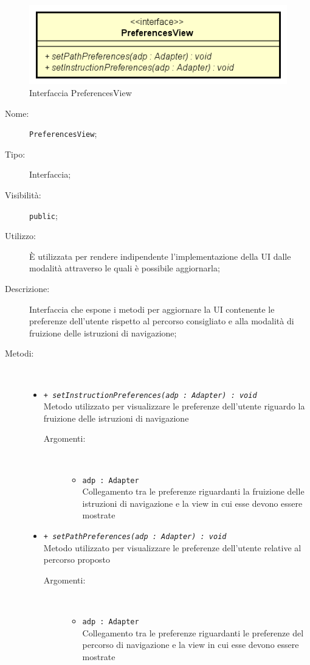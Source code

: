 \documentclass[../DefinizioneDiProdotto.tex]{subfiles}
\begin{document}
    \begin{figure}[H]
        \centering
        \includegraphics{img/PreferencesView.png}
        \caption{Interfaccia PreferencesView}\label{fig:view::PreferencesView} 
    \end{figure}
    \begin{description}
\item[Nome:] \texttt{PreferencesView};
\item[Tipo:] Interfaccia;
\item[Visibilità:] \texttt{public};
\item[Utilizzo:] È utilizzata per rendere indipendente l'implementazione della UI dalle modalità attraverso le quali è possibile aggiornarla;
\item[Descrizione:] Interfaccia che espone i metodi per aggiornare la UI contenente le preferenze dell'utente rispetto al percorso consigliato e alla modalità di fruizione delle istruzioni di navigazione;
\item[Metodi:] \
\begin{itemize}
\item \texttt{+ \textit{setInstructionPreferences(adp : Adapter) : void}}\\
Metodo utilizzato per visualizzare le preferenze dell'utente riguardo la fruizione delle istruzioni di navigazione
 \begin{description}
\item[Argomenti:] \
\begin{itemize}
\item \texttt{adp : Adapter}\\
Collegamento tra le preferenze riguardanti la fruizione delle istruzioni di navigazione e la view in cui esse devono essere mostrate\end{itemize}
\end{description}
\item \texttt{+ \textit{setPathPreferences(adp : Adapter) : void}}\\
Metodo utilizzato per visualizzare le preferenze dell'utente relative al percorso proposto
 \begin{description}
\item[Argomenti:] \
\begin{itemize}
\item \texttt{adp : Adapter}\\
Collegamento tra le preferenze riguardanti le preferenze del percorso di navigazione e la view in cui esse devono essere mostrate\end{itemize}
\end{description}
\end{itemize}
\end{description}
\end{document}
